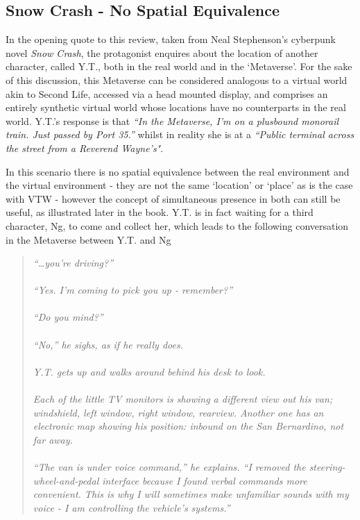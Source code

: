 \subsection{Snow Crash - No Spatial Equivalence}
In the opening quote to this review, taken from Neal Stephenson's cyberpunk novel \textit{Snow Crash}, the protagonist enquires about the location of another character, called Y.T., both in the real world and in the `Metaverse'. For the sake of this discussion, this Metaverse can be considered analogous to a virtual world akin to Second Life, accessed via a head mounted display, and comprises an entirely synthetic virtual world whose locations have no counterparts in the real world. Y.T.'s response is that \textit{``In  the Metaverse, I'm on a plusbound monorail train. Just passed by Port 35.''} whilst in reality she is at a \textit{``Public terminal across the street from a Reverend Wayne's"}.

In this scenario there is no spatial equivalence between the real environment and the virtual environment - they are not the same `location' or `place' as is the case with VTW - however the concept of simultaneous presence in both can still be useful, as illustrated later in the book. Y.T. is in fact waiting for a third character, Ng, to come and collect her, which leads to the following conversation in the Metaverse between Y.T. and Ng

\begin{quote}
\textit{``\ldots you're driving?''}
\\
\\
\textit{``Yes. I'm coming to pick you up - remember?''}
\\
\\
\textit{``Do you mind?''}
\\
\\
\textit{``No,'' he sighs, as if he really does.}
\\
\\
\textit{Y.T. gets up and walks around behind his desk to look.}
\\
\\
\textit{Each of the little TV monitors is showing a different view out his van; windshield,  left  window,  right  window, rearview.  Another  one  has  an electronic map  showing his position: inbound on the San Bernardino, not far
away.}
\\
\\
\textit{``The  van  is  under  voice  command,''  he  explains.  ``I  removed  the steering-wheel-and-pedal  interface because  I found  verbal  commands  more convenient. This  is why I will  sometimes  make unfamiliar  sounds with  my voice - I am controlling the vehicle's systems.''}
\end{quote}

